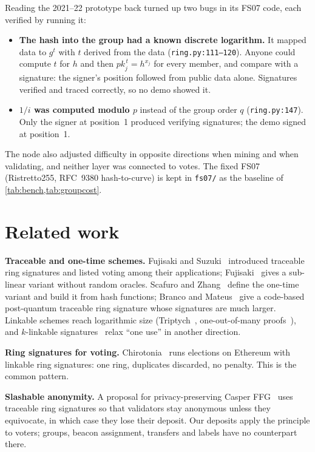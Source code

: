 \documentclass[11pt,a4paper]{article}
\newcommand{\pk}{\mathit{pk}}
\theoremstyle{definition}
\begin{document}
Reading the 2021--22 prototype back turned up two bugs in its FS07 code,
each verified by running it:
\begin{itemize}[leftmargin=*]
\item \textbf{The hash into the group had a known discrete logarithm.} It
      mapped data to $g^{t}$ with $t$ derived from the data
      (\texttt{ring.py:111--120}). Anyone could compute $t$ for $h$ and
      then $\pk_j^{\,t} = h^{x_j}$ for every member, and compare with a
      signature: the signer's position followed from public data alone.
      Signatures verified and traced correctly, so no demo showed it.
\item \textbf{$1/i$ was computed modulo $p$} instead of the group order
      $q$ (\texttt{ring.py:147}). Only the signer at position~1 produced
      verifying signatures; the demo signed at position~1.
\end{itemize}
The node also adjusted difficulty in opposite directions when mining and
when validating, and neither layer was connected to votes. The fixed FS07
(Ristretto255, RFC~9380 hash-to-curve) is kept in \texttt{fs07/} as the
baseline of \cref{tab:bench,tab:groupcost}.

\section{Related work}
\label{sec:related}

\textbf{Traceable and one-time schemes.} Fujisaki and Suzuki~\cite{FS07}
introduced traceable ring signatures and listed voting among their
applications; Fujisaki~\cite{Fujisaki2011} gives a sub-linear variant
without random oracles. Scafuro and Zhang~\cite{SZ21} define the
one-time variant and build it from hash functions; Branco and
Mateus~\cite{BrancoMateus2018} give a code-based post-quantum traceable
ring signature whose signatures are much larger. Linkable schemes reach
logarithmic size (Triptych~\cite{Triptych2020}, one-out-of-many
proofs~\cite{GK15}), and $k$-linkable signatures~\cite{KLinkable2025}
relax ``one use'' in another direction.

\textbf{Ring signatures for voting.} Chirotonia~\cite{Chirotonia2021}
runs elections on Ethereum with linkable ring signatures: one ring,
duplicates discarded, no penalty. This is the common pattern.

\textbf{Slashable anonymity.} A proposal for privacy-preserving Casper
FFG~\cite{CasperTRS} uses traceable ring signatures so that validators
stay anonymous unless they equivocate, in which case they lose their
deposit. Our deposits apply the principle to voters; groups, beacon
assignment, transfers and labels have no counterpart there.
\end{document}
